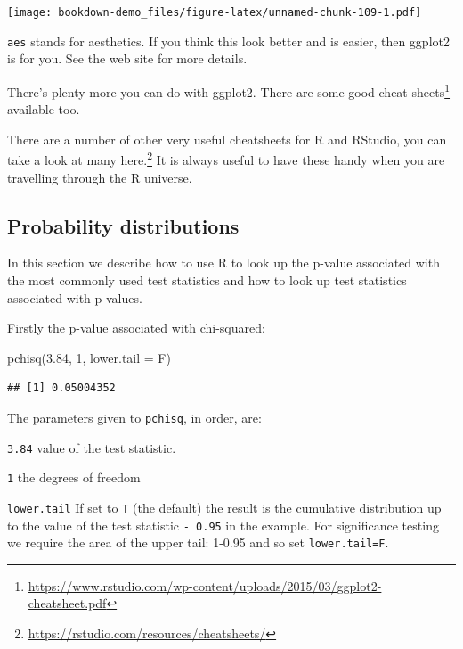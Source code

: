 \documentclass[
]{book}
\makeatletter
\newenvironment{Shaded}{\begin{snugshade}}{\end{snugshade}}
\newcommand{\AttributeTok}[1]{\textcolor[rgb]{0.77,0.63,0.00}{#1}}
\newcommand{\DecValTok}[1]{\textcolor[rgb]{0.00,0.00,0.81}{#1}}
\newcommand{\FloatTok}[1]{\textcolor[rgb]{0.00,0.00,0.81}{#1}}
\newcommand{\FunctionTok}[1]{\textcolor[rgb]{0.00,0.00,0.00}{#1}}
\newcommand{\NormalTok}[1]{#1}
\renewcommand{\href}[2]{#2\footnote{\url{#1}}}
\newenvironment{kframe}{%
\medskip{}
\setlength{\fboxsep}{.8em}
 \def\at@end@of@kframe{}%
 \ifinner\ifhmode%
  \def\at@end@of@kframe{\end{minipage}}%
  \begin{minipage}{\columnwidth}%
 \fi\fi%
 \def\FrameCommand##1{\hskip\@totalleftmargin \hskip-\fboxsep
 \colorbox{shadecolor}{##1}\hskip-\fboxsep
     \hskip-\linewidth \hskip-\@totalleftmargin \hskip\columnwidth}%
 \MakeFramed {\advance\hsize-\width
   \@totalleftmargin\z@ \linewidth\hsize
   \@setminipage}}%
 {\par\unskip\endMakeFramed%
 \at@end@of@kframe}
\newenvironment{rmdblock}[1]
  {
  \begin{itemize}
  \renewcommand{\labelitemi}{
    \raisebox{-.7\height}[0pt][0pt]{
      {\setkeys{Gin}{width=3em,keepaspectratio}\texttt{[image: images/\#1]}}
    }
  }
  \setlength{\fboxsep}{1em}
  \begin{kframe}
  \item
  }
  {
  \end{kframe}
  \end{itemize}
  }
\newenvironment{rmdnote}
  {\begin{rmdblock}{note}}
  {\end{rmdblock}}
\makeatother
\begin{document}
\texttt{[image: bookdown-demo\_files/figure-latex/unnamed-chunk-109-1.pdf]}

\texttt{aes} stands for aesthetics. If you think this look better and is easier, then ggplot2 is for you. See the web site for more details.

There's plenty more you can do with ggplot2. There are some good \href{https://www.rstudio.com/wp-content/uploads/2015/03/ggplot2-cheatsheet.pdf}{cheat sheets} available too.

\begin{rmdnote}
There are a number of other very useful cheatsheets for R and RStudio, you can take a look at many \href{https://rstudio.com/resources/cheatsheets/}{here.} It is always useful to have these handy when you are travelling through the R universe.
\end{rmdnote}

\hypertarget{probability-distributions}{%
\subsection{Probability distributions}\label{probability-distributions}}

In this section we describe how to use R to look up the p-value associated with the most
commonly used test statistics and how to look up test statistics associated with p-values.

Firstly the p-value associated with chi-squared:

\begin{Shaded}
\begin{Highlighting}[]
\FunctionTok{pchisq}\NormalTok{(}\FloatTok{3.84}\NormalTok{, }\DecValTok{1}\NormalTok{, }\AttributeTok{lower.tail =}\NormalTok{ F)}
\end{Highlighting}
\end{Shaded}

\begin{verbatim}
## [1] 0.05004352
\end{verbatim}

The parameters given to \texttt{pchisq}, in order, are:

\texttt{3.84} value of the test statistic.

\texttt{1} the degrees of freedom

\texttt{lower.tail} If set to \texttt{T} (the default) the result is the cumulative distribution up to the value of the test statistic \texttt{-\ 0.95} in the example. For significance testing we require the area of the upper tail: 1-0.95 and so set \texttt{lower.tail=F}.
\end{document}
